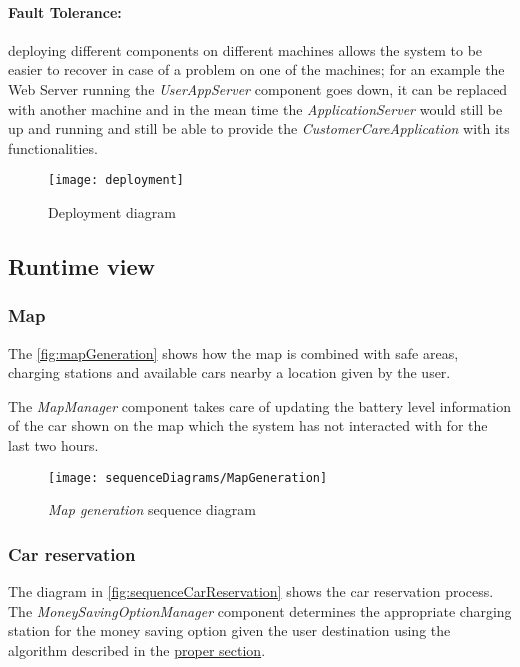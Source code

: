 \paragraph{Fault Tolerance:}deploying different components on different machines allows the system to be easier to recover in case of a problem on one of the machines; for an example the Web Server running the \textit{UserAppServer} component goes down, it can be replaced with another machine and in the mean time the \textit{ApplicationServer} would still be up and running and still be able to provide the \textit{CustomerCareApplication} with its functionalities.
\clearpage

\begin{figure}[t!]
	\centering
	\texttt{[image: deployment]}
	\caption{
		\label{fig:deployment} 
		Deployment diagram
	}
\end{figure}

\clearpage
\subsection{Runtime view}

\subsubsection{Map}
The \autoref{fig:mapGeneration} shows how the map is combined with safe areas, charging stations and available cars nearby a location given by the user.

The \emph{MapManager} component takes care of updating the battery level information of the car shown on the map which the system has not interacted with for the last two hours.\\


\begin{figure}[h!]
	\centering
	\texttt{[image: sequenceDiagrams/MapGeneration]}
	\caption{
		\label{fig:mapGeneration} 
		\emph{Map generation} sequence diagram
	}
\end{figure}

\clearpage
\subsubsection{Car reservation}
The diagram in \autoref{fig:sequenceCarReservation} shows the car reservation process.\\
The \mbox{\emph{MoneySavingOptionManager}} component determines the appropriate charging station for the money saving option given the user destination using the algorithm described in the \hyperref[sec:msoAlgorithm]{proper section}.

